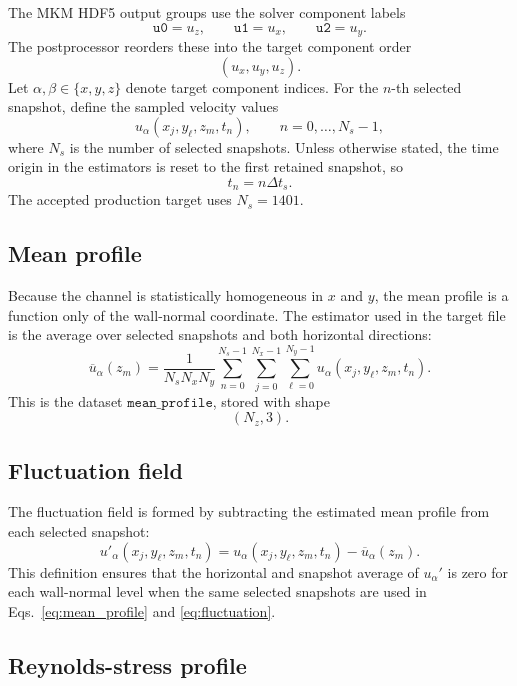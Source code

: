 \documentclass[11pt]{article}
\begin{document}
The MKM HDF5 output groups use the solver component labels
\[
  \texttt{u0}=u_z,\qquad
  \texttt{u1}=u_x,\qquad
  \texttt{u2}=u_y.
\]
The postprocessor reorders these into the target component order
\[
  (u_x,u_y,u_z).
\]
Let \(\alpha,\beta\in\{x,y,z\}\) denote target component indices. For the
\(n\)-th selected snapshot, define the sampled velocity values
\[
  u_\alpha(x_j,y_\ell,z_m,t_n),
  \qquad n=0,\ldots,N_s-1,
\]
where \(N_s\) is the number of selected snapshots. Unless otherwise stated,
the time origin in the estimators is reset to the first retained snapshot, so
\[
  t_n=n\Delta t_s .
\]
The accepted production target uses \(N_s=1401\).

\subsection{Mean profile}

Because the channel is statistically homogeneous in \(x\) and \(y\), the mean
profile is a function only of the wall-normal coordinate. The estimator used in
the target file is the average over selected snapshots and both horizontal
directions:
\begin{equation}
  \overline{u}_{\alpha}(z_m)
  =
  \frac{1}{N_sN_xN_y}
  \sum_{n=0}^{N_s-1}
  \sum_{j=0}^{N_x-1}
  \sum_{\ell=0}^{N_y-1}
  u_\alpha(x_j,y_\ell,z_m,t_n).
  \label{eq:mean_profile}
\end{equation}
This is the dataset \(\texttt{mean\_profile}\), stored with shape
\[
  (N_z,3).
\]

\subsection{Fluctuation field}

The fluctuation field is formed by subtracting the estimated mean profile from
each selected snapshot:
\begin{equation}
  u'_\alpha(x_j,y_\ell,z_m,t_n)
  =
  u_\alpha(x_j,y_\ell,z_m,t_n)
  -
  \overline{u}_{\alpha}(z_m).
  \label{eq:fluctuation}
\end{equation}
This definition ensures that the horizontal and snapshot average of
\(u_\alpha'\) is zero for each wall-normal level when the same selected
snapshots are used in Eqs.~\eqref{eq:mean_profile} and
\eqref{eq:fluctuation}.

\subsection{Reynolds-stress profile}
\end{document}
